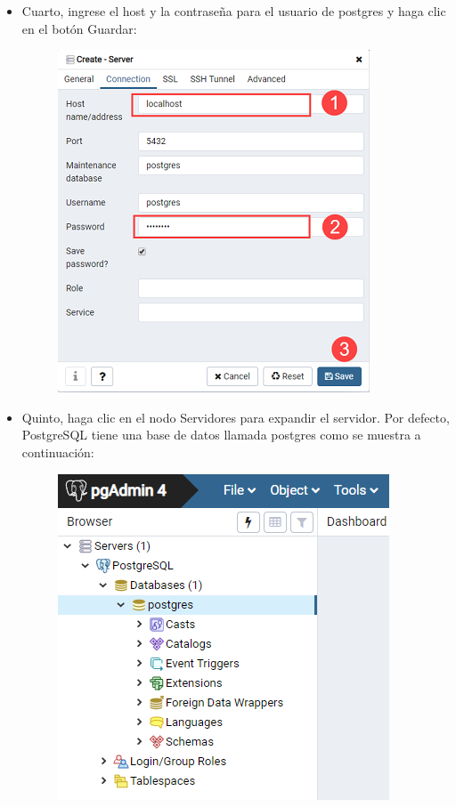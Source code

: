 \documentclass[10pt]{article}
\newcommand{\postgres}[1]{{\textcolor{R}{PostgreSQL} #1}}
\begin{document}
\begin{itemize}
\item Cuarto, ingrese el host y la contraseña para el usuario de postgres y haga clic en el botón Guardar:


\begin{figure}[H]
  \begin{center}
  	 \includegraphics{figures/cap2/img8.png}	 
	 \renewcommand{\arraystretch}{1.3}
  \end{center}
\end{figure}

\item Quinto, haga clic en el nodo Servidores para expandir el servidor. Por defecto, \postgres{} tiene una base de datos llamada postgres como se muestra a continuación:

\begin{figure}[H]
  \begin{center}
  	 \includegraphics{figures/cap2/img9.png}	 
	 \renewcommand{\arraystretch}{1.3}
  \end{center}
\end{figure}


\end{itemize}
\end{document}
